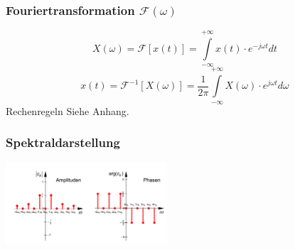 \begin{multicols}{2}

  \subsubsection*{Fouriertransformation $\mathcal{F}(\omega)$}
  $$ X(\omega) = \mathcal{F}[x(t)] = \int \limits _{-\infty} ^{+\infty} x(t) \cdot e^{-j \omega t} dt $$
  $$ x(t) = \mathcal{F}^{-1}[X(\omega)] = \frac{1}{2 \pi} \int \limits _{- \infty} ^{+ \infty} X(\omega) \cdot e^{j \omega t} d\omega$$
  Rechenregeln Siehe Anhang.


  \subsubsection*{Spektraldarstellung}
  \includegraphics[width = 6cm]{include/Integraltransformationen/img/Spektrum.png}
\end{multicols}

